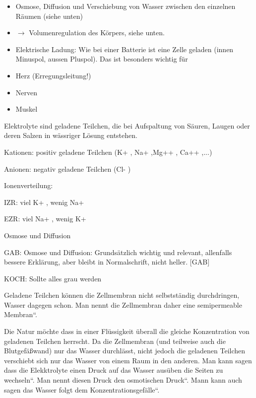 \documentclass{article}
\begin{document}
\begin{itemize}
\item Osmose, Diffusion und Verschiebung von Wasser zwischen den
einzelnen R\"aumen (siehe unten)

\end{itemize}
\begin{itemize}
\item ${\rightarrow}$ Volumenregulation des K\"orpers, siehe unten.  

\end{itemize}
\begin{itemize}
\item Elektrische Ladung: Wie bei einer Batterie ist eine Zelle geladen
(innen Minuspol, aussen Pluspol). Das ist besonders wichtig f\"ur

\end{itemize}
\begin{itemize}
\item Herz (Erregungsleitung!)

\item Nerven

\item Muskel

\end{itemize}
Elektrolyte sind geladene Teilchen, die  bei Aufspaltung von S\"auren,
Laugen  oder deren Salzen in w\"assriger L\"osung  entstehen.

Kationen: positiv geladene Teilchen (K+ , Na+ ,Mg++ , Ca++ ,...)

Anionen: negativ geladene Teilchen (Cl- )

Ionenverteilung:

IZR: viel K+ , wenig Na+

EZR: viel Na+ , wenig K+

%
%
Osmose und Diffusion

GAB: Osmose und Diffusion: Grunds\"atzlich wichtig und relevant,
allenfalls bessere Erkl\"arung, aber bleibt in Normalschrift, nicht
heller. [GAB]

KOCH: Sollte alles grau werden

Geladene Teilchen k\"onnen die Zellmembran nicht selbstst\"andig
durchdringen, Wasser dagegen schon. Man nennt die Zellmembran daher
eine {\quotedblbase}semipermeable
Membran{\textquotedblleft}. 

Die Natur m\"ochte dass in einer Fl\"ussigkeit \"uberall die gleiche
Konzentration von geladenen Teilchen herrscht. Da die Zellmembran (und
teilweise auch die Blutgef\"a{\ss}wand) nur das Wasser durchl\"asst,
nicht jedoch die geladenen Teilchen verschiebt sich nur das Wasser von
einem Raum in den anderen. Man kann sagen dass die Elekktrolyte einen
Druck auf das Wasser aus\"uben {\quotedblbase}die Seiten zu
wechseln{\textquotedblleft}. Man nennt diesen Druck den
{\quotedblbase}osmotischen
Druck{\textquotedblleft}. Mann kann auch sagen {\quotedblbase}das
Wasser folgt dem Konzentrationsgef\"alle{\textquotedblleft}.
\end{document}
